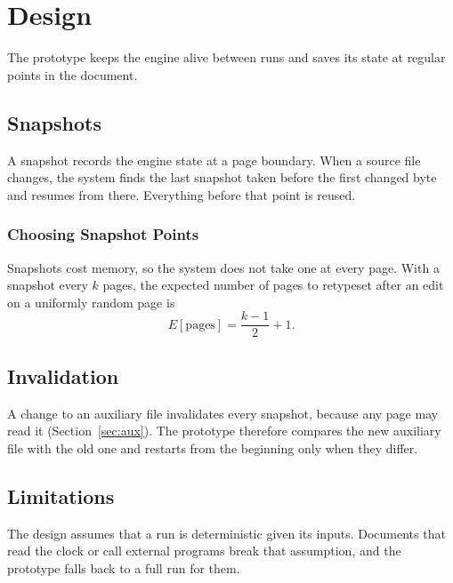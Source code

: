 \chapter{Design}
\label{chap:design}

The prototype keeps the engine alive between runs and saves its state at
regular points in the document.

\section{Snapshots}
\label{sec:snapshots}

A snapshot records the engine state at a page boundary. When a source file
changes, the system finds the last snapshot taken before the first changed
byte and resumes from there. Everything before that point is reused.

\subsection{Choosing Snapshot Points}
\label{sec:snapshot-points}

Snapshots cost memory, so the system does not take one at every page. With a
snapshot every $k$ pages, the expected number of pages to retypeset after an
edit on a uniformly random page is
\begin{equation}
  E[\text{pages}] = \frac{k - 1}{2} + 1 .
  \label{eq:expected-pages}
\end{equation}

\section{Invalidation}
\label{sec:invalidation}

A change to an auxiliary file invalidates every snapshot, because any page
may read it (Section~\ref{sec:aux}). The prototype therefore compares the new
auxiliary file with the old one and restarts from the beginning only when
they differ.

\section{Limitations}
\label{sec:limitations}

The design assumes that a run is deterministic given its inputs. Documents
that read the clock or call external programs break that assumption, and the
prototype falls back to a full run for them.

